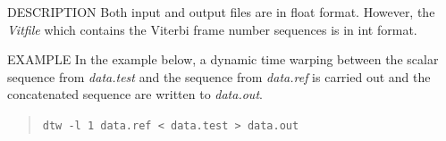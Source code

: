 \begin{qsection}{DESCRIPTION}
 Both input and output files are in float format. However,
 the {\em Vitfile} which contains the Viterbi frame number
 sequences is in int format.
\end{qsection}
\begin{options}
\end{options}

\begin{qsection}{EXAMPLE}
 In the example below, a dynamic time warping between the scalar
 sequence from {\em data.test} and
 the sequence from {\em data.ref} is carried out and
 the concatenated sequence are written to {\em data.out}.
\begin{quote}
 \verb!dtw -l 1 data.ref < data.test > data.out!
\end{quote}
\end{qsection}

